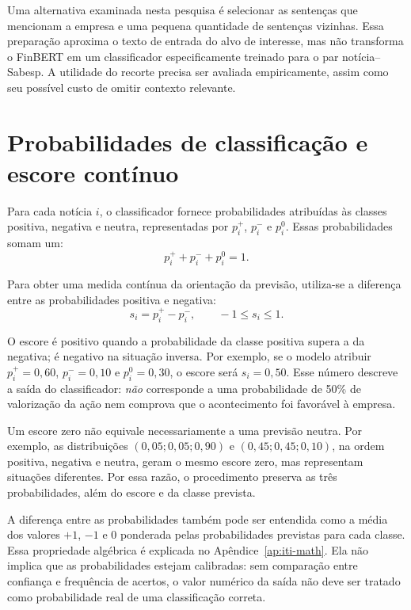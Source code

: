 Uma alternativa examinada nesta pesquisa é selecionar as sentenças que mencionam a empresa e uma pequena quantidade de sentenças vizinhas. Essa preparação aproxima o texto de entrada do alvo de interesse, mas não transforma o FinBERT em um classificador especificamente treinado para o par notícia--Sabesp. A utilidade do recorte precisa ser avaliada empiricamente, assim como seu possível custo de omitir contexto relevante.

\section{Probabilidades de classificação e escore contínuo}

Para cada notícia $i$, o classificador fornece probabilidades atribuídas às classes positiva, negativa e neutra, representadas por $p_i^+$, $p_i^-$ e $p_i^0$. Essas probabilidades somam um:
\begin{equation}
    p_i^+ + p_i^- + p_i^0 = 1.
\end{equation}

Para obter uma medida contínua da orientação da previsão, utiliza-se a diferença entre as probabilidades positiva e negativa:
\begin{equation}
    s_i = p_i^+ - p_i^- , \qquad -1 \leq s_i \leq 1.
\end{equation}

O escore é positivo quando a probabilidade da classe positiva supera a da negativa; é negativo na situação inversa. Por exemplo, se o modelo atribuir $p_i^+=0{,}60$, $p_i^-=0{,}10$ e $p_i^0=0{,}30$, o escore será $s_i=0{,}50$. Esse número descreve a saída do classificador: \emph{não} corresponde a uma probabilidade de 50\% de valorização da ação nem comprova que o acontecimento foi favorável à empresa.

Um escore zero não equivale necessariamente a uma previsão neutra. Por exemplo, as distribuições $(0{,}05;0{,}05;0{,}90)$ e $(0{,}45;0{,}45;0{,}10)$, na ordem positiva, negativa e neutra, geram o mesmo escore zero, mas representam situações diferentes. Por essa razão, o procedimento preserva as três probabilidades, além do escore e da classe prevista.

A diferença entre as probabilidades também pode ser entendida como a média dos valores $+1$, $-1$ e $0$ ponderada pelas probabilidades previstas para cada classe. Essa propriedade algébrica é explicada no Apêndice~\ref{ap:iti-math}. Ela não implica que as probabilidades estejam calibradas: sem comparação entre confiança e frequência de acertos, o valor numérico da saída não deve ser tratado como probabilidade real de uma classificação correta.

